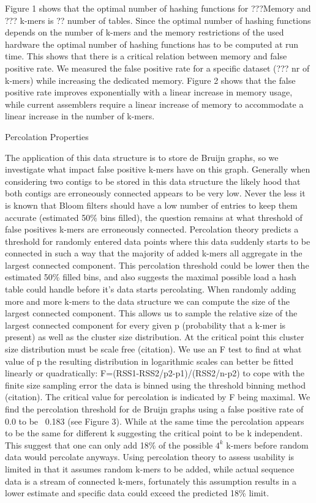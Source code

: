 \documentclass[12pt]{article} \usepackage{simplemargins}
\begin{document}
 Figure 1 shows that the optimal number of hashing functions for
 ???Memory and ??? k-mers is ?? number of tables. Since the optimal
 number of hashing functions depends on the number of k-mers and the
 memory restrictions of the used hardware the optimal number of
 hashing functions has to be computed at run time.  This shows that
 there is a critical relation between memory and false positive
 rate. We measured the false positive rate for a specific dataset (???
 nr of k-mers) while increasing the dedicated memory. Figure 2 shows
 that the false positive rate improves exponentially with a linear
 increase in memory usage, while current assemblers require a linear
 increase of memory to accommodate a linear increase in the number of
 k-mers.

Percolation Properties

The application of this data structure is to store de Bruijn graphs,
so we investigate what impact false positive k-mers have on this
graph. Generally when considering two contigs to be stored in this
data structure the likely hood that both contigs are erroneously
connected appears to be very low. Never the less it is known that
Bloom filters should have a low number of entries to keep them
accurate (estimated 50\% bins filled), the question remains at what
threshold of false positives k-mers are erroneously
connected. Percolation theory predicts a threshold for randomly entered data
points where this data suddenly starts to be connected in such a way that the majority 
of added k-mers all aggregate in the largest connected component. This percolation
threshold could be lower then the estimated 50\% filled bins, and also
suggests the maximal possible load a hash table could handle before it's data
starts percolating. 
When randomly adding more and more k-mers to the data
structure we can compute the size of the largest connected
component. This allows us to sample the relative size of the largest connected component
for every given p (probability that a k-mer is present) as well as the cluster size distribution.
At the critical point this cluster size distribution must be scale free (citation). We use an F test
to find at what value of p the resulting distribution in logarithmic scales can
better be fitted linearly or quadratically:
F=(RSS1-RSS2/p2-p1)/(RSS2/n-p2)
to cope with the finite size sampling error the data is binned using the
threshold binning method (citation).
The critical value for percolation is indicated by F being maximal.
We find the percolation threshold for de Bruijn graphs using a false 
positive rate of 0.0 to be ~0.183 (see Figure 3). While at the same time
the percolation appears to be the same for different k suggesting the 
critical point to be k independent.
This suggest that one can only add 18\% of the possible $4^k$ k-mers
before random data would percolate anyways. Using percolation theory to 
assess usability is limited in that it assumes
random k-mers to be added, while actual sequence data is a stream of
connected k-mers, fortunately this assumption results in a lower estimate and specific data
could exceed the predicted 18\% limit.
\end{document}
